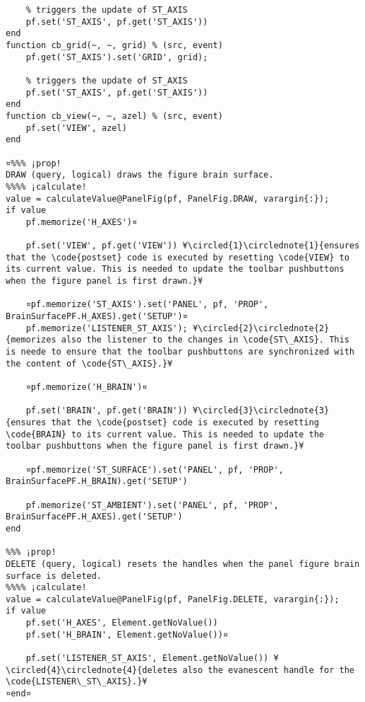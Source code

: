\documentclass{tufte-handout}
\begin{document}
\begin{lstlisting}
    % triggers the update of ST_AXIS
    pf.set('ST_AXIS', pf.get('ST_AXIS'))
end
function cb_grid(~, ~, grid) % (src, event)
    pf.get('ST_AXIS').set('GRID', grid);

    % triggers the update of ST_AXIS
    pf.set('ST_AXIS', pf.get('ST_AXIS'))
end
function cb_view(~, ~, azel) % (src, event)
    pf.set('VIEW', azel)
end

¤%%% ¡prop!
DRAW (query, logical) draws the figure brain surface.
%%%% ¡calculate!
value = calculateValue@PanelFig(pf, PanelFig.DRAW, varargin{:});
if value
    pf.memorize('H_AXES')¤

    pf.set('VIEW', pf.get('VIEW')) ¥\circled{1}\circlednote{1}{ensures that the \code{postset} code is executed by resetting \code{VIEW} to its current value. This is needed to update the toolbar pushbuttons when the figure panel is first drawn.}¥

    ¤pf.memorize('ST_AXIS').set('PANEL', pf, 'PROP', BrainSurfacePF.H_AXES).get('SETUP')¤
    pf.memorize('LISTENER_ST_AXIS'); ¥\circled{2}\circlednote{2}{memorizes also the listener to the changes in \code{ST\_AXIS}. This is neede to ensure that the toolbar pushbuttons are synchronized with the content of \code{ST\_AXIS}.}¥
    
    ¤pf.memorize('H_BRAIN')¤

    pf.set('BRAIN', pf.get('BRAIN')) ¥\circled{3}\circlednote{3}{ensures that the \code{postset} code is executed by resetting \code{BRAIN} to its current value. This is needed to update the toolbar pushbuttons when the figure panel is first drawn.}¥

    ¤pf.memorize('ST_SURFACE').set('PANEL', pf, 'PROP', BrainSurfacePF.H_BRAIN).get('SETUP')
    
    pf.memorize('ST_AMBIENT').set('PANEL', pf, 'PROP', BrainSurfacePF.H_AXES).get('SETUP')
end

%%% ¡prop!
DELETE (query, logical) resets the handles when the panel figure brain surface is deleted.
%%%% ¡calculate!
value = calculateValue@PanelFig(pf, PanelFig.DELETE, varargin{:});
if value
    pf.set('H_AXES', Element.getNoValue())
    pf.set('H_BRAIN', Element.getNoValue())¤

    pf.set('LISTENER_ST_AXIS', Element.getNoValue()) ¥\circled{4}\circlednote{4}{deletes also the evanescent handle for the \code{LISTENER\_ST\_AXIS}.}¥
¤end¤
\end{lstlisting}
\end{document}

